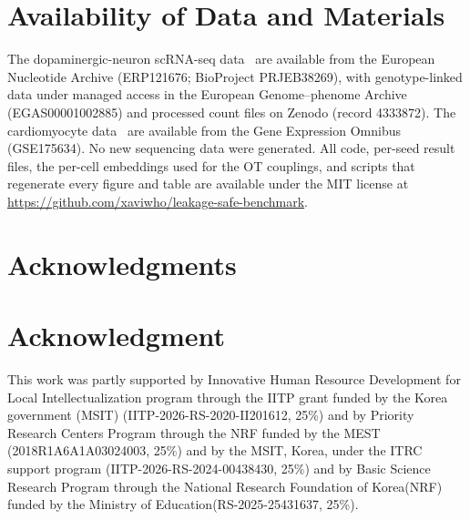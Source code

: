 \documentclass[10pt,journal,compsoc]{IEEEtran}
\begin{document}
\section*{Availability of Data and Materials}

The dopaminergic-neuron scRNA-seq data~\cite{jerber2021population} are available from the European Nucleotide Archive (ERP121676; BioProject PRJEB38269), with genotype-linked data under managed access in the European Genome--phenome Archive (EGAS00001002885) and processed count files on Zenodo (record 4333872). The cardiomyocyte data~\cite{elorbany2022single} are available from the Gene Expression Omnibus (GSE175634). No new sequencing data were generated. All code, per-seed result files, the per-cell embeddings used for the OT couplings, and scripts that regenerate every figure and table are available under the MIT license at \url{https://github.com/xaviwho/leakage-safe-benchmark}.

\ifCLASSOPTIONcompsoc
  \section*{Acknowledgments}
\else
  \section*{Acknowledgment}
\fi

This work was partly supported by Innovative Human Resource Development for Local Intellectualization program through the IITP grant funded by the Korea government (MSIT) (IITP-2026-RS-2020-II201612, 25\%) and by Priority Research Centers Program through the NRF funded by the MEST (2018R1A6A1A03024003, 25\%) and by the MSIT, Korea, under the ITRC support program (IITP-2026-RS-2024-00438430, 25\%) and by Basic Science Research Program through the National Research Foundation of Korea(NRF) funded by the Ministry of Education(RS-2025-25431637, 25\%).




%
%
%
%
%
\end{document}
